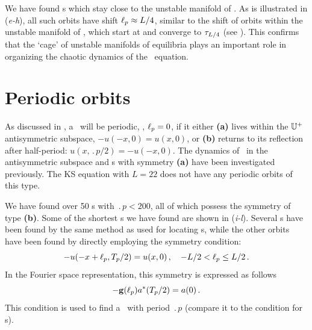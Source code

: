 We have found \rpo s which stay
close to the unstable manifold of .
As is illustrated in (\textit{e-h}), all such orbits have
shift $\ell_p \approx L/4$, similar to the shift of orbits within
the unstable manifold of , which start at  and
converge to $\tau_{L/4}$ (see ). This
confirms that the `cage' of unstable manifolds of equilibria plays
an important role in organizing the chaotic dynamics of the \KS\
equation.


\section{Periodic orbits} \label{ssec:po}
As discussed in , a \rpo\ will be periodic, \ie,
$\ell_p = 0$, if it either {\bf (a)} lives within the $\mathbb{U}^+$ antisymmetric
subspace, $-u(-x,0) = u(x,0)$, or {\bf (b)} returns to its reflection
after half-period: $u(x,\period{p}/2)=-u(-x,0)$.  The dynamics of
\KSe\ in the antisymmetric subspace and \po s with symmetry {\bf (a)} have
been investigated
previously. The KS equation
with $L = 22$ does not have any periodic orbits of this type.


We have found over 50 \po s with $\period{p} < 200$, 
all of which possess the symmetry
of type {\bf (b)}. %
Some of the shortest \po s we have found are shown in
(\textit{i-l}).  Several \po s have been found by the same
method as used for locating \rpo s, while the other orbits have been
found by directly employing the symmetry condition:
\[ -u(-x+\ell_p,{T_{p}}/2) = u(x,0)\,, \quad -L/2 < \ell_p \leq L/2\,.\]
In the Fourier space representation, this symmetry is expressed as
follows
\[ -\mathbf{g}(\ell_p)a^\ast({T_{p}}/2) = a(0)\,. \]
This condition is used to find a \po\ with period $\period{p}$
(compare it to the condition  for \rpo s).


